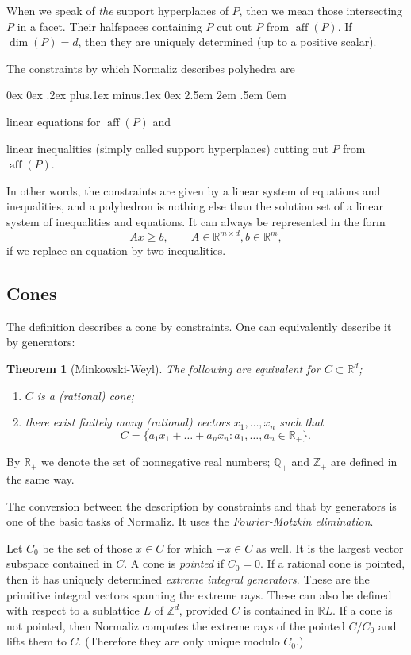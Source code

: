 \documentclass[12pt,a4paper]{scrartcl}
\newcounter{listi}
\newcommand{\stdli}{ \topsep0ex \partopsep0ex %
\parsep.2ex plus.1ex minus.1ex \itemsep0ex%
\leftmargin2.5em \labelwidth2em \labelsep.5em \rightmargin0em}%
\newenvironment{arab}{\begin{list}{\textup{(\arabic{listi})}}%
	{\usecounter{listi}\stdli}}{\end{list}}
\newtheorem{theorem}{Theorem}
\theoremstyle{definition}
\def\ZZ{{\mathbb Z}}
\def\QQ{{\mathbb Q}}
\def\RR{{\mathbb R}}
\DeclareMathOperator{\aff}{aff}
\begin{document}
When we speak of \emph{the} support hyperplanes of $P$, then we mean those intersecting $P$ in a facet. Their halfspaces containing $P$ cut out $P$ from $\aff(P)$. If $\dim(P)=d$, then they are uniquely determined (up to a positive scalar).

The constraints by which Normaliz describes polyhedra are
\begin{arab}
	\item linear equations for $\aff(P)$ and
	\item linear inequalities (simply called support hyperplanes) cutting out $P$ from $\aff(P)$.
\end{arab}
In other words, the constraints are given by a linear system of equations and inequalities, and a polyhedron is nothing else than the solution set of a linear system of inequalities and equations. It can always be represented in the form
$$
Ax\ge b, \qquad A\in\RR^{m\times d}, b\in \RR^m,
$$
if we replace an equation by two inequalities.

\subsection{Cones}

The definition describes a cone by constraints. One can equivalently describe it by generators:

\begin{theorem}[Minkowski-Weyl]
	The following are equivalent for $C\subset\RR^d$;
	\begin{enumerate}
		\item $C$ is a (rational) cone;
		\item there exist finitely many (rational) vectors $x_1,\dots,x_n$ such that
		$$
		C=\{a_1x_1+\dots+a_nx_n:a_1,\dots,a_n\in\RR_+\}.
		$$
	\end{enumerate}
\end{theorem}

By $\RR_+$ we denote the set of nonnegative real numbers; $\QQ_+$ and $\ZZ_+$ are defined in the same way.

The conversion between the description by constraints and that by generators is one of the basic tasks of Normaliz. It uses the \emph{Fourier-Motzkin elimination}.

Let $C_0$ be the set of those $x\in C$ for which $-x\in C$ as well. It is the largest vector subspace contained in $C$.
A cone is \emph{pointed} if $C_0=0$. If a rational cone is pointed, then it has uniquely determined \emph{extreme integral generators}. These are the primitive integral vectors spanning the extreme rays. These can also be defined with respect to a sublattice $L$ of $\ZZ^d$, provided $C$ is contained in $\RR L$. If a cone is not pointed, then Normaliz computes the extreme rays of the pointed $C/C_0$ and lifts them to $C$. (Therefore they are only unique modulo $C_0$.)
\end{document}
